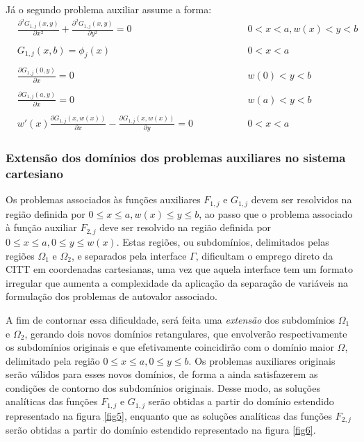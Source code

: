 Já o segundo problema auxiliar assume a forma:
\begin{subequations}
\begin{alignat}{2}
	& \frac{\partial^2 G_{1,j}(x, y)}{\partial x^2} + \frac{\partial^2 G_{1,j}(x, y)}{\partial y^2} = 0 \quad\quad && 0 < x < a, w(x) < y < b \label{funcao_G_harm_T1_cart} \\ \nonumber \\
	& G_{1,j}(x, b) = \phi_j(x) && 0 < x < a  \label{funcao_G_cc_T1_2_cart} \\ \nonumber \\
	& \frac{\partial G_{1,j}(0, y)}{\partial x} = 0 && w(0) < y < b \label{funcao_G_cc_T1_1a_cart} \\ \nonumber \\
	& \frac{\partial G_{1,j}(a, y)}{\partial x} = 0 && w(a) < y < b \label{funcao_G_cc_T1_1b_cart} \\ \nonumber \\
	& w'(x)\frac{\partial G_{1,j}(x, w(x))}{\partial x} - \frac{\partial G_{1,j}(x, w(x))}{\partial y} = 0 \quad\quad\quad\quad && 0 < x < a \label{funcao_G_cc_grad_T1_cart}
\end{alignat}
\end{subequations}

\subsubsection{Extensão dos domínios dos problemas auxiliares no sistema cartesiano}\label{secao_formulacao_aux}

Os problemas associados às funções auxiliares $F_{1,j}$ e $G_{1,j}$ devem ser resolvidos na região definida por $0 \le x \le a, w(x) \le y \le b$, ao passo que o problema associado à função auxiliar $F_{2,j}$ deve ser resolvido na região definida por $0 \le x \le a, 0 \le y \le w(x)$. Estas regiões, ou subdomínios, delimitados pelas regiões $\Omega_1$ e $\Omega_2$, e separados pela interface $\Gamma$, dificultam o emprego direto da CITT em coordenadas
cartesianas, uma vez que aquela interface tem um formato irregular que aumenta a complexidade da aplicação da separação de variáveis na formulação dos problemas
de autovalor associado.

A fim de contornar essa dificuldade, será feita uma \textit{extensão} dos subdomínios $\Omega_1$ e $\Omega_2$, gerando dois novos domínios retangulares,
que envolverão respectivamente os subdomínios originais e que efetivamente coincidirão com o domínio maior $\Omega$, delimitado pela região $0 \le x \le a, 0 \le y \le b$. Os problemas auxiliares originais serão válidos para esses novos domínios, de forma a ainda
satisfazerem as condições de contorno dos subdomínios originais.
Desse modo, as soluções analíticas das funções $F_{1, j}$ e $G_{1, j}$ serão obtidas a partir do domínio estendido representado na figura \ref{fig5}, enquanto que
as soluções analíticas das funções $F_{2, j}$ serão obtidas a partir do domínio estendido representado na figura \ref{fig6}.

